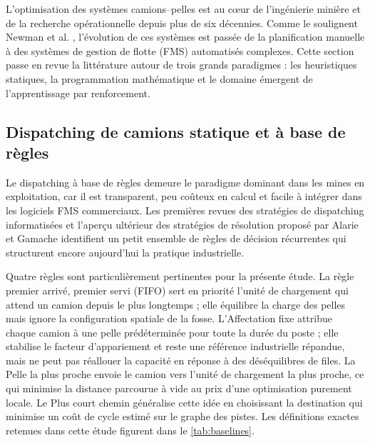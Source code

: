 \documentclass[11pt,a4paper]{article}
\newif\ifrevmarks
\newcommand{\revtag}[1]{\ifrevmarks\textsuperscript{\textcolor{red!70!black}{\scriptsize[#1]}}\fi}
\newcommand{\rev}[2]{\ifrevmarks{\color{revcolor}#2}\revtag{#1}\else#2\fi}
\newenvironment{revbloc}[1]{\par\ifrevmarks\color{revcolor}\noindent\revtag{#1}\ \fi}{\par}
\begin{document}
L'optimisation des systèmes camions--pelles est au c\oe ur de l'ingénierie minière et de la recherche opérationnelle depuis plus de six décennies. \rev{m22}{Comme le soulignent Newman et al.} \cite{AlexandraNewman2010}, l'évolution de ces systèmes est passée de la planification manuelle à des systèmes de gestion de flotte (FMS) automatisés complexes. Cette section passe en revue la littérature autour de trois grands paradigmes : les heuristiques statiques, la programmation mathématique et le domaine émergent de l'apprentissage par renforcement.

\subsection{Dispatching de camions statique et à base de règles}

Le dispatching à base de règles demeure le paradigme dominant dans les mines en exploitation, car il est transparent, peu coûteux en calcul et facile à intégrer dans les logiciels FMS commerciaux. Les premières revues des stratégies de dispatching informatisées \cite{MohanMunirathinam1994} et l'aperçu ultérieur des stratégies de résolution proposé par Alarie et Gamache \cite{Alarie2002} identifient un petit ensemble de règles de décision récurrentes qui structurent encore aujourd'hui la pratique industrielle.

\begin{revbloc}{M25, Dir. corr. 1}
Quatre règles sont particulièrement pertinentes pour la présente étude. La règle premier arrivé, premier servi (FIFO) sert en priorité l'unité de chargement qui attend un camion depuis le plus longtemps ; elle équilibre la charge des pelles mais ignore la configuration spatiale de la fosse. L'Affectation fixe attribue chaque camion à une pelle prédéterminée pour toute la durée du poste ; elle stabilise le facteur d'appariement et reste une référence industrielle répandue, mais ne peut pas réallouer la capacité en réponse à des déséquilibres de files. La Pelle la plus proche envoie le camion vers l'unité de chargement la plus proche, ce qui minimise la distance parcourue à vide au prix d'une optimisation purement locale. Le Plus court chemin généralise cette idée en choisissant la destination qui minimise un coût de cycle estimé sur le graphe des pistes. Les définitions exactes retenues dans cette étude figurent dans le \cref{tab:baselines}.
\end{revbloc}
\end{document}
